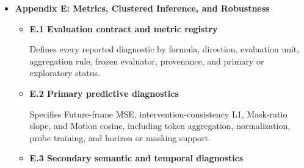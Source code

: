 \begin{itemize}
\begin{itemize}
    \item \textbf{D.2 Architecture \(\times\) structured-supervision
    factorial}

    Compares matched monolithic and factorized predictors with and
    without DINOv2-derived structured supervision, isolating
    architecture, supervision, and their interaction.

    \item \textbf{D.3 Factor pathways and objective ablations}

    Tests the layout--agent target loss, visibility pathway,
    interaction pathway, sparsity regularization, and separation
    objective through controlled one-factor removals.

    \item \textbf{D.4 Falsification controls and sensitivity}

    Evaluates temporally misaligned and clip-shuffled teacher targets,
    reliability weighting, factor ranks, and loss coefficients to
    distinguish structured information from generic regularization.

    \item \textbf{D.5 Attribution synthesis}

    Consolidates the factorial contrasts and component ablations,
    reporting which mechanisms account for each prediction,
    visibility, interaction, motion, and RGB result.

\end{itemize}

\item \textbf{Appendix E: Metrics, Clustered Inference, and Robustness}
\begin{itemize}

    \item \textbf{E.1 Evaluation contract and metric registry}

    Defines every reported diagnostic by formula, direction, evaluation
    unit, aggregation rule, frozen evaluator, provenance, and
    primary or exploratory status.

    \item \textbf{E.2 Primary predictive diagnostics}

    Specifies Future-frame MSE, intervention-consistency L1,
    Mask-ratio slope, and Motion cosine, including token aggregation,
    normalization, probe training, and horizon or masking support.

    \item \textbf{E.3 Secondary semantic and temporal diagnostics}


\end{itemize}
\end{itemize}
